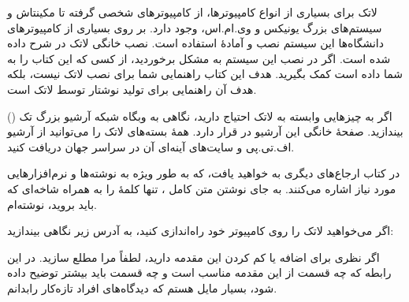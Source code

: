 \bigskip
\noindent 
لاتک برای بسیاری از انواع کامپیوترها، از کامپیوترهای شخصی گرفته تا مکینتاش و سیستم‌های بزرگ یونیکس و وی.ام.اس، وجود دارد. بر روی بسیاری از کامپیوترهای دانشگاه‌ها این سیستم نصب و آمادهٔ استفاده است. نصب خانگی لاتک در 
\guide
شرح داده شده است. اگر در نصب این سیستم به مشکل برخوردید، از کسی که این کتاب را به شما داده است کمک بگیرید. هدف این کتاب راهنمایی شما برای نصب لاتک نیست، بلکه هدف آن راهنمایی برای تولید نوشتار توسط لاتک است.

\bigskip
\noindent 
اگر به چیزهایی وابسته به لاتک احتیاج دارید، نگاهی به وبگاه شبکه آرشیو بزرگ تک 
()
بیندازید. صفحهٔ خانگی این آرشیو در 
قرار دارد. 
همهٔ بسته‌های لاتک را می‌توانید از آرشیو اف.تی.پی 
و سایت‌های آینه‌ای آن در سراسر جهان دریافت کنید.

در کتاب ارجاع‌های دیگری به 
خواهید یافت، که به طور ویژه به نوشته‌ها و نرم‌افزارهایی مورد نیاز اشاره می‌کنند. به جای نوشتن متن کامل 
،
تنها کلمهٔ 
را به همراه شاخه‌ای که باید بروید، نوشته‌ام.

اگر می‌خواهید لاتک را روی کامپیوتر خود راه‌اندازی کنید، به آدرس زیر نگاهی بیندازید:

\setRL


\noindent 
اگر نظری برای اضافه یا کم کردن این مقدمه دارید، لطفاً مرا مطلع سازید.  در این رابطه که چه قسمت از این مقدمه مناسب است و چه قسمت باید بیشتر توضیح داده شود، بسیار مایل هستم که دیدگاه‌های افراد تازه‌کار رابدانم.

\bigskip

\begin{latin}
\begin{verse}
%
\end{verse}
\end{latin}
